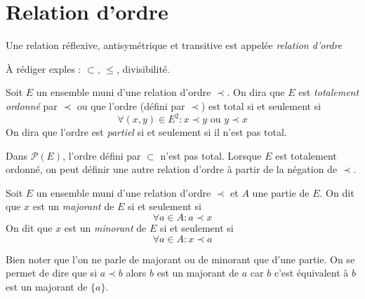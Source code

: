 \section{Relation d'ordre}
\begin{defi}
 Une relation réflexive, antisymétrique et transitive est appelée \emph{relation d'ordre}
\end{defi}
\begin{exples}
\`A rédiger exples : $\subset$, $\leq$, divisibilité.  
\end{exples}

\begin{defi}
 Soit $E$ un ensemble muni d'une relation d'ordre $\prec$. On dira que $E$ est \emph{totalement ordonné} par $\prec$ ou que l'ordre (défini par $\prec$) est total si et seulement si 
\begin{displaymath}
 \forall (x,y)\in E^2 : x \prec y \text{ ou } y \prec x
\end{displaymath}
On dira que l'ordre est \emph{partiel} si et seulement si il n'est pas total.
\end{defi}
\begin{exples}
 Dans $\mathcal P(E)$, l'ordre défini par $\subset$ n'est pas total. Lorsque $E$ est totalement ordonné, on peut définir une autre relation d'ordre à partir de la négation de $\prec$.
\end{exples}

 
\begin{defi}
  Soit $E$ un ensemble muni d'une relation d'ordre $\prec$ et $A$ une partie de $E$.\newline
On dit que $x$ est un \emph{majorant} de $E$ si et seulement si 
\begin{displaymath}
 \forall a\in A : a \prec x
\end{displaymath}
On dit que $x$ est un \emph{minorant} de $E$ si et seulement si 
\begin{displaymath}
 \forall a\in A : x \prec a
\end{displaymath}
\end{defi}
\begin{rem}
 Bien noter que l'on ne parle de majorant ou de minorant que d'une partie. On se permet de dire que si $a \prec b$ alors $b$ est un majorant de $a$ car $b$ c'est équivalent à $b$ est un majorant de $\{a\}$.
\end{rem}


